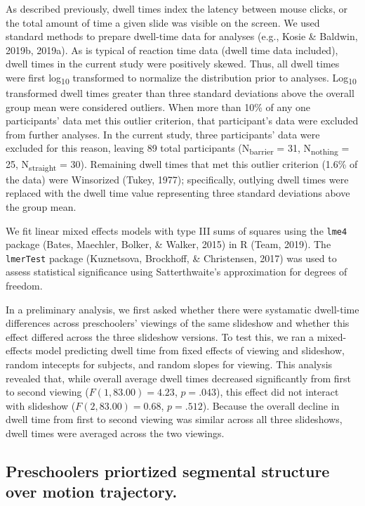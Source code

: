 \documentclass[
  english,
  man,floatsintext]{apa6}
\begin{document}
As described previously, dwell times index the latency between mouse clicks, or the total amount of time a given slide was visible on the screen. We used standard methods to prepare dwell-time data for analyses (e.g., Kosie \& Baldwin, 2019b, 2019a). As is typical of reaction time data (dwell time data included), dwell times in the current study were positively skewed. Thus, all dwell times were first log\textsubscript{10} transformed to normalize the distribution prior to analyses. Log\textsubscript{10} transformed dwell times greater than three standard deviations above the overall group mean were considered outliers. When more than 10\% of any one participants' data met this outlier criterion, that participant's data were excluded from further analyses. In the current study, three participants' data were excluded for this reason, leaving 89 total participants (N\textsubscript{barrier} = 31, N\textsubscript{nothing} = 25, N\textsubscript{straight} = 30). Remaining dwell times that met this outlier criterion (1.6\% of the data) were Winsorized (Tukey, 1977); specifically, outlying dwell times were replaced with the dwell time value representing three standard deviations above the group mean.

We fit linear mixed effects models with type III sums of squares using the \texttt{lme4} package (Bates, Maechler, Bolker, \& Walker, 2015) in R (Team, 2019). The \texttt{lmerTest} package (Kuznetsova, Brockhoff, \& Christensen, 2017) was used to assess statistical significance using Satterthwaite's approximation for degrees of freedom.

In a preliminary analysis, we first asked whether there were systamatic dwell-time differences across preschoolers' viewings of the same slideshow and whether this effect differed across the three slideshow versions. To test this, we ran a mixed-effects model predicting dwell time from fixed effects of viewing and slideshow, random intecepts for subjects, and random slopes for viewing. This analysis revealed that, while overall average dwell times decreased significantly from first to second viewing (\(F(1, 83.00) = 4.23\), \(p = .043\)), this effect did not interact with slideshow (\(F(2, 83.00) = 0.68\), \(p = .512\)). Because the overall decline in dwell time from first to second viewing was similar across all three slideshows, dwell times were averaged across the two viewings.

\hypertarget{preschoolers-priortized-segmental-structure-over-motion-trajectory.}{%
\subsection{Preschoolers priortized segmental structure over motion trajectory.}\label{preschoolers-priortized-segmental-structure-over-motion-trajectory.}}
\end{document}

